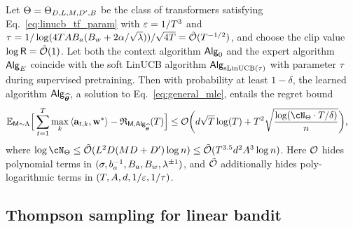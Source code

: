 \begin{theorem}\label{thm:smooth_linucb}
Let $\Theta = \Theta_{D, L, M, {D'}, B}$ be the class of transformers satisfying Eq.~\eqref{eq:linucb_tf_param} with $\varepsilon=1/{T}^3$ and ${\tau} = 1/ \log(4{T}{A} B_a(B_w+2\alpha/\sqrt{\lambda}))/\sqrt{4{T}}={\tilde{\mathcal O}}({T}^{-1/2})$, and choose the clip value $\log{\mathsf{R}} = {\tilde{\mathcal O}}(1)$. Let both the context algorithm ${\mathsf{Alg}}_0$ and the expert algorithm ${\mathsf{Alg}}_{E}$ coincide with the soft LinUCB algorithm ${\mathsf{Alg}}_{{\mathrm{sLinUCB}}(\tau)}$ with parameter $\tau$ during supervised pretraining. Then with probability at least $1-\delta$, the learned algorithm ${\mathsf{Alg}}_{{\widehat{{\boldsymbol \theta}}}}$, a solution to Eq.~\eqref{eq:general_mle}, entails the regret bound
\begin{align*}
\E_{\inst\sim\prior}\Big[\sum_{t=1}^\totlen\max_{k}\<\ba_{t,k},\bw^*\>-\totreward_{\inst,\sAlg_\esttfpar}(\totlen)\Big]&\leq   \cO\bigg( d\sqrt{\totlen}\log(\totlen)+ \totlen^2\sqrt{\frac{\log ( \cN_{\Parspace} \cdot \totlen/\delta )}{n} } \bigg),
\end{align*}
where $\log \cN_{\Parspace} \le \tcO(\layer^2\embd(\head\embd+\hidden) \log\Numobs) \leq \tcO(\totlen^{3.5} d^2 \Numact^3\log\Numobs)$. Here $\mathcal{O}$ hides polynomial terms in $(\sigma, b_a^{-1}, B_a, \\B_w, \lambda^{\pm1})$, and ${\tilde{\mathcal O}}$ additionally hides poly-logarithmic terms in $({T}, {A}, d, 1/\varepsilon,1/{\tau})$. 
\end{theorem}



\subsection{Thompson sampling for linear bandit}\label{sec:TS-statement}


